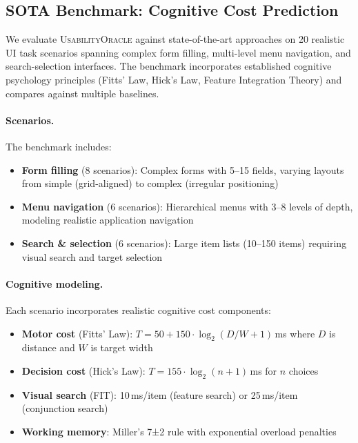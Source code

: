 \documentclass[11pt,twocolumn]{article}
\theoremstyle{definition}
\newcommand{\tool}{\textsc{UsabilityOracle}}
\begin{document}
\subsection{SOTA Benchmark: Cognitive Cost Prediction}

We evaluate \tool{} against state-of-the-art approaches on 20 realistic UI task scenarios spanning complex form filling, multi-level menu navigation, and search-selection interfaces. The benchmark incorporates established cognitive psychology principles (Fitts' Law, Hick's Law, Feature Integration Theory) and compares against multiple baselines.

\paragraph{Scenarios.}
The benchmark includes:
\begin{itemize}[leftmargin=1.5em]
\item \textbf{Form filling} (8 scenarios): Complex forms with 5--15 fields, varying layouts from simple (grid-aligned) to complex (irregular positioning)
\item \textbf{Menu navigation} (6 scenarios): Hierarchical menus with 3--8 levels of depth, modeling realistic application navigation
\item \textbf{Search \& selection} (6 scenarios): Large item lists (10--150 items) requiring visual search and target selection
\end{itemize}

\paragraph{Cognitive modeling.}
Each scenario incorporates realistic cognitive cost components:
\begin{itemize}[leftmargin=1.5em]
\item \textbf{Motor cost} (Fitts' Law): $T = 50 + 150 \cdot \log_2(D/W + 1)$\,ms where $D$ is distance and $W$ is target width
\item \textbf{Decision cost} (Hick's Law): $T = 155 \cdot \log_2(n + 1)$\,ms for $n$ choices
\item \textbf{Visual search} (FIT): 10\,ms/item (feature search) or 25\,ms/item (conjunction search)
\item \textbf{Working memory}: Miller's 7±2 rule with exponential overload penalties
\end{itemize}
\end{document}
